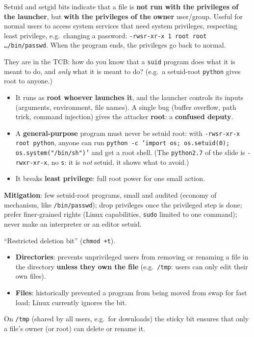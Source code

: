 \begin{defnbox}[title=\texttt{suid} / \texttt{sgid}]
Setuid and setgid bits indicate that a file is \textbf{not run with the privileges of
the launcher}, but \textbf{with the privileges of the owner} user/group. Useful for
normal users to access system services that need system privileges, respecting least
privilege, e.g.\ changing a password:
\texttt{-rwsr-xr-x 1 root root \ldots /bin/passwd}. When the program ends, the privileges go back
to normal.
\end{defnbox}

\begin{warnbox}[title=Setuid root programs are dangerous]
They are in the TCB: how do you know that a \texttt{suid} program does what it is meant
to do, and \emph{only} what it is meant to do? (e.g.\ a setuid-root \texttt{python}
gives root to anyone.)
\end{warnbox}

\begin{exbox}[title=Why a setuid-root program is dangerous]
\begin{itemize}
  \item It runs as \textbf{root whoever launches it}, and the launcher controls its
        inputs (arguments, environment, file names). A single bug (buffer overflow, path
        trick, command injection) gives the attacker \textbf{root}: a
        \textbf{confused deputy}.
  \item A \textbf{general-purpose} program must never be setuid root: with
        \texttt{-rwsr-xr-x root python}, anyone can run
        \texttt{python -c 'import os; os.setuid(0); os.system("/bin/sh")'} and get a
        root shell. (The \texttt{python2.7} of the slide is \texttt{-rwxr-xr-x}, no
        \texttt{s}: it is \emph{not} setuid, it shows what to avoid.)
  \item It breaks \textbf{least privilege}: full root power for one small action.
\end{itemize}
\textbf{Mitigation}: few setuid-root programs, small and audited (economy of mechanism,
like \texttt{/bin/passwd}); drop privileges once the privileged step is done; prefer
finer-grained rights (Linux capabilities, \texttt{sudo} limited to one command); never
make an interpreter or an editor setuid.
\end{exbox}

\begin{defnbox}[title=Sticky bit]
``Restricted deletion bit'' (\texttt{chmod +t}).
\begin{itemize}
  \item \textbf{Directories}: prevents unprivileged users from removing or renaming a
        file in the directory \textbf{unless they own the file} (e.g.\ \texttt{/tmp}:
        users can only edit their own files).
  \item \textbf{Files}: historically prevented a program from being moved from swap
        for fast load; Linux currently ignores the bit.
\end{itemize}
On \texttt{/tmp} (shared by all users, e.g.\ for downloads) the sticky bit ensures that only a
file's owner (or root) can delete or rename it.
\end{defnbox}


